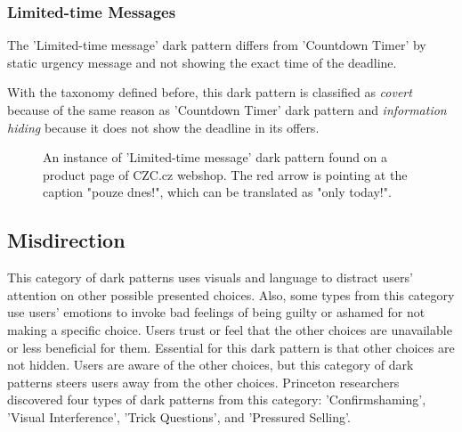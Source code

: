         \subsubsection{Limited-time Messages}
        The 'Limited-time message' dark pattern differs from 'Countdown Timer' by static urgency message and not showing the exact time of the deadline. 
        
        With the taxonomy defined before, this dark pattern is classified as \emph{covert} because of the same reason as 'Countdown Timer' dark pattern and \emph{information hiding} because it does not show the deadline in its offers.

        \begin{figure}[ht]
            \centering
            \caption{An instance of 'Limited-time message' dark pattern found on a product page of CZC.cz webshop. The red arrow is pointing at the caption "pouze dnes!", which can be translated as "only today!".}
            \label{fig:limited-time-message-czc}
        \end{figure}

        \subsection{Misdirection}
        This category of dark patterns uses visuals and language to distract users' attention on other possible presented choices. Also, some types from this category use users' emotions to invoke bad feelings of being guilty or ashamed for not making a specific choice. Users trust or feel that the other choices are unavailable or less beneficial for them. Essential for this dark pattern is that other choices are not hidden. Users are aware of the other choices, but this category of dark patterns steers users away from the other choices. Princeton researchers discovered four types of dark patterns from this category: 'Confirmshaming', 'Visual Interference', 'Trick Questions', and 'Pressured Selling'.
